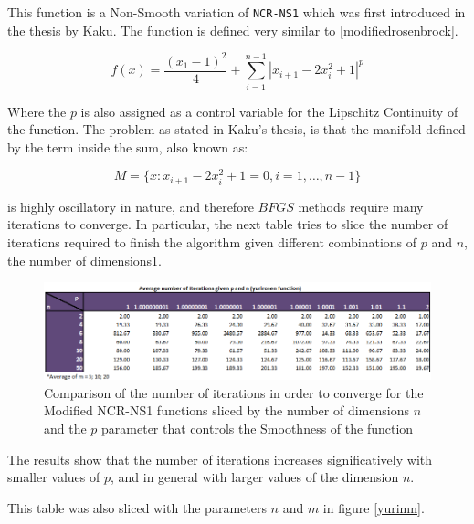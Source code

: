 This function is a Non-Smooth variation of \texttt{NCR-NS1} which was first introduced in the thesis by Kaku\citep{kaku}. The function is defined very similar to \ref{modifiedrosenbrock}.

\begin{equation} \label{modifiedyurirosen}
    f(x) = \frac{(x_1 - 1)^2}{4} + \sum_{i = 1}^{n-1} |x_{i+1} - 2x_{i}^2 + 1|^p
\end{equation}

Where the $p$ is also assigned as a control variable for the Lipschitz Continuity of the function. The problem as stated in Kaku's thesis, is that the manifold defined by the term inside the sum, also known as:

\begin{equation} \label{kakumanifold}
    M = \{x: x_{i+1} - 2x_i^2 + 1 = 0, i = 1, \hdots, n-1 \}
\end{equation}

is highly oscillatory in nature, and therefore $BFGS$ methods require many iterations to converge. In particular, the next table tries to slice the number of iterations required to finish the algorithm given different combinations of $p$ and $n$, the number of dimensions\ref{yuripn}.

\begin{figure}
\begin{center}
\includegraphics[scale=0.6]{Figures/yurirosenpn.PNG}
\caption[Comparison of selected values of the Modified NCR-NS1 function sliced by p and n]{Comparison of the number of iterations in order to converge for the Modified NCR-NS1 functions sliced by the number of dimensions $n$ and the $p$ parameter that controls the Smoothness of the function}
\label{yuripn}
\end{center}
\end{figure} 

The results show that the number of iterations increases significatively with smaller values of $p$, and in general with larger values of the dimension $n$.

This table was also sliced with the parameters $n$ and $m$ in figure \ref{yurimn}.

